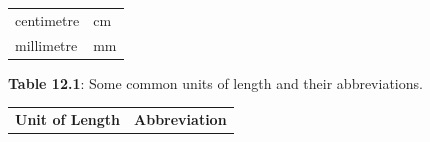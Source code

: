 {{\begin{center}
\begin{tabular}[t]{|l|l|}
        centimetre &
        cm%
     \tabularnewline\cline{1-1}\cline{2-2}
        millimetre &
        mm%
     \tabularnewline\cline{1-1}\cline{2-2}
    \end{tabular}
      \end{center}
    \begin{center}{\small\bfseries Table 12.1}: Some common units of length and their abbreviations.\end{center}
          }{ %
        \begin{center}
      \label{m39370*uid8}
    \noindent
      \tablelasttail{}
      \begin{xtabular}[t]{|l|l|}\hline
                \textbf{Unit of Length}
               &
                \textbf{Abbreviation}
     \tabularnewline{}

\end{xtabular}
\end{center}}}
